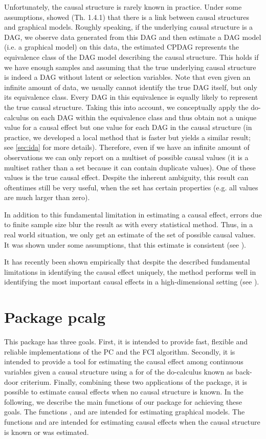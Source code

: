 \documentclass[article]{jss}
\begin{document}
Unfortunately, the causal structure is rarely known in practice. Under some
assumptions, \cite{Pearl00} showed (Th. 1.4.1) that there is a link between
causal structures and graphical models. Roughly speaking, if the underlying
causal structure is a DAG, we observe data generated from this DAG and then
estimate a DAG model (i.e. a graphical model) on this data, the estimated
CPDAG represents the equivalence class of the DAG model describing the
causal structure. This holds if we have enough samples and assuming that
the true underlying causal structure is indeed a DAG without latent or
selection variables. Note that even given an infinite amount of data, we
usually cannot identify the true DAG itself, but only its equivalence
class. Every DAG in this equivalence is equally likely to represent the
true causal structure. Taking this into account, we conceptually apply the
do-calculus on each DAG within the equivalence class and thus obtain not a
unique value for a causal effect but one value for each DAG in the causal
structure (in practice, we developed a local method that is faster but
yields a similar result; see \ref{sec:ida} for more details). Therefore,
even if we have an infinite amount of observations we can only report on a
multiset of possible causal values (it is a multiset rather than a set
because it can contain duplicate values). One of these values is the true
causal effect. Despite the inherent ambiguity, this result can oftentimes
still be very useful, when the set has certain properties (e.g. all values
are much larger than zero).

In addition to this fundamental limitation in estimating a causal effect,
errors due to finite sample size blur the result as with every statistical
method. Thus, in a real world situation, we only get an estimate of the set
of possible causal values. It was shown under some assumptions, that this
estimate is consistent (see \cite{BuKaMa10}).

It has recently been shown empirically that despite the described
fundamental limitations in identifying the causal effect uniquely, the
method performs well in identifying the most important causal effects in a
high-dimensional setting (see \cite{NatMethods10}).

\section{Package pcalg}
This package has three goals. First, it is intended to provide fast,
flexible and reliable implementations of the PC and the FCI
algorithm. Secondly, it is intended to provide a tool for estimating the
causal effect among continuous variables given a causal structure
using a for of the do-calculus known as back-door criterium. Finally, combining
these two applications of the package, it is possible to estimate causal
effects when no causal structure is known. In the following, we describe
the main functions of our package for achieving these goals. The functions
,  and  are intended for estimating
graphical models. The functions  and  are intended
for estimating causal effects when the causal structure is known or was
estimated.
\end{document}
